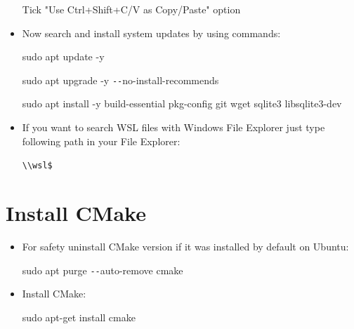 \documentclass[a4paper,12pt]{book}
\begin{document}
\begin{itemize}
\begin{minipage}[t]{\linewidth}
		\medskip
		Tick "Use Ctrl+Shift+C/V as Copy/Paste" option
	\end{minipage}
	\item Now search and install system updates by using commands:
	
	\vspace{3mm}
	sudo apt update -y
	
	\vspace{0.05mm}
	sudo apt upgrade -y \texttt{-{}-}no-install-recommends
	
	
	sudo apt install -y build-essential pkg-config git wget sqlite3 libsqlite3-dev
	\vspace{3mm}
	
	\item If you want to search WSL files with Windows File Explorer just type following path in your File Explorer:
	
	\vspace{3mm}
	\verb*|\\wsl$|
\end{itemize}
\section{Install CMake}
\begin{itemize}
	\item For safety uninstall CMake version if it was installed by default on Ubuntu:
	
	\vspace{3mm}
	sudo apt purge \texttt{-{}-}auto-remove cmake
	\vspace{3mm}
	
	\item Install CMake:
	
	\vspace{3mm}
	sudo apt-get install cmake
	\vspace{3mm}
\end{itemize}
\end{document}
